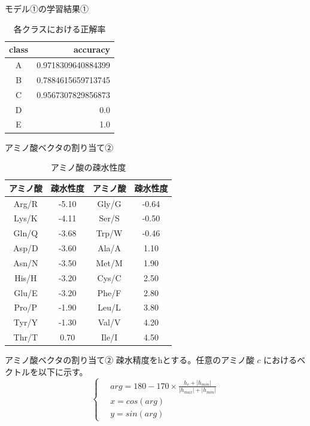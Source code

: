 \documentclass[dvipdfmx]{beamer}
\begin{document}
  \begin{frame}{モデル①の学習結果①}
    \begin{table}[H]
      \centering
      \caption{各クラスにおける正解率}
      \begin{tabular}{cr}
        \hline
        class & accuracy \\
        \hline \hline
        A & 0.9718309640884399 \\
        B & 0.7884615659713745 \\
        C & 0.9567307829856873 \\
        D & 0.0 \\
        E & 1.0 \\
        \hline
      \end{tabular}
    \end{table}
  \end{frame}

  \begin{frame}{アミノ酸ベクタの割り当て②}
    \begin{table}[h]
      \caption{アミノ酸の疎水性度}
      \begin{tabular}{cccc}
          \hline
          アミノ酸 & 疎水性度 & アミノ酸 & 疎水性度 \\
          \hline \hline 
          Arg/R & -5.10 & Gly/G & -0.64 \\
          Lys/K & -4.11 & Ser/S & -0.50 \\
          Gln/Q & -3.68 & Trp/W & -0.46 \\
          Asp/D & -3.60 & Ala/A & 1.10 \\
          Asn/N & -3.50 & Met/M & 1.90 \\
          His/H & -3.20 & Cys/C & 2.50 \\
          Glu/E & -3.20 & Phe/F & 2.80 \\
          Pro/P & -1.90 & Leu/L & 3.80 \\
          Tyr/Y & -1.30 & Val/V & 4.20 \\
          Thr/T & 0.70 & Ile/I & 4.50 \\
          \hline
      \end{tabular}
    \end{table}
  \end{frame}

  \begin{frame}{アミノ酸ベクタの割り当て②}
    疎水精度をhとする。任意のアミノ酸 \(c\) におけるベクトルを以下に示す。
    \[
      \left\{ \,
          \begin{aligned}
          &  arg = 180 - 170 \times \frac{h_c + |h_{min}|}{|h_{max}| + |h_{min}|} \\
          & x = cos(arg) \\
          & y = sin(arg)
          \end{aligned}
      \right.
    \]   
  \end{frame}
\end{document}
